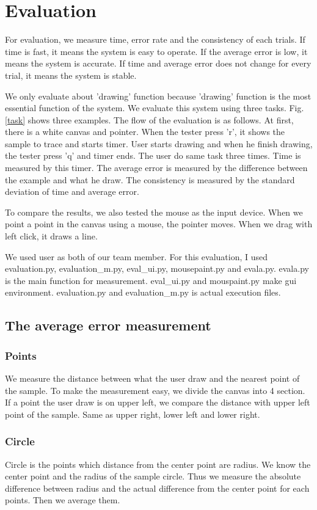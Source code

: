 \clearpage
\section{Evaluation}
For evaluation, we measure time, error rate and the consistency of each trials.
If time is fast, it means the system is easy to operate.
If the average error is low, it means the system is accurate.
If time and average error does not change for every trial, it means the system is stable.
\par
We only evaluate about 'drawing' function because 'drawing' function is the most essential function of the system.
We evaluate this system using three tasks. Fig. \ref{task} shows three examples.
The flow of the evaluation is as follows. At first, there is a white canvas and pointer.
When the tester press 'r', it shows the sample to trace and starts timer.
User starts drawing and when he finish drawing, the tester press 'q' and timer ends.
The user do same task three times.
Time is measured by this timer. The average error is measured by the difference between the example and what he draw. The consistency is measured by the standard deviation of time and average error.
\par
To compare the results, we also tested the mouse as the input device. When we point a point in the canvas using a mouse, the pointer moves. When we drag with left click, it draws a line.\par
We used user as both of our team member.
For this evaluation, I used evaluation.py, evaluation\_m.py, eval\_ui.py, mousepaint.py and evala.py.
evala.py is the main function for measurement. eval\_ui.py and mouspaint.py make gui environment. evaluation.py and evaluation\_m.py is actual execution files.
\subsection{The average error measurement}
\subsubsection{Points}
We measure the distance between what the user draw and the nearest point of the sample.
To make the measurement easy, we divide the canvas into 4 section.
If a point the user draw is on upper left, we compare the distance with upper left point of the sample. Same as upper right, lower left and lower right.
\subsubsection{Circle}
Circle is the points which distance from the center point are radius.
We know the center point and the radius of the sample circle.
Thus we measure the absolute difference between radius and the actual difference from the center point for each points. Then we average them.
